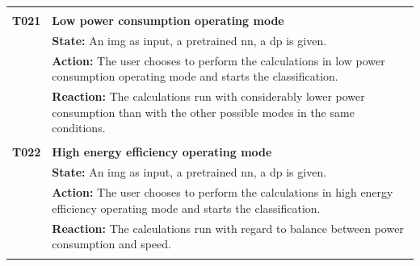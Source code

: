\documentclass[parskip=full]{scrartcl}
\begin{document}
\begin{tabular}{p{2cm}p{12cm}}
& \\
\textbf{T021} & \textbf{Low \gls{power consumption} operating mode}\\
& \textbf{State:} An \gls{img} as input, a pretrained \gls{nn}, a \gls{dp} is given.\\
& \textbf{Action:} The user chooses to perform the calculations in low \gls{power consumption} operating mode and starts the classification.\\
& \textbf{Reaction:} The calculations run with considerably lower \gls{power consumption} than with the other possible modes in the same conditions.\\
& \\
\textbf{T022} & \textbf{High energy efficiency operating mode}\\
& \textbf{State:} An \gls{img} as input, a pretrained \gls{nn}, a \gls{dp} is given.\\
& \textbf{Action:} The user chooses to perform the calculations in high energy efficiency operating mode and starts the classification.\\
& \textbf{Reaction:} The calculations run with regard to balance between \gls{power consumption} and speed.\\
& \\
\end{tabular}
\newpage
\end{document}
